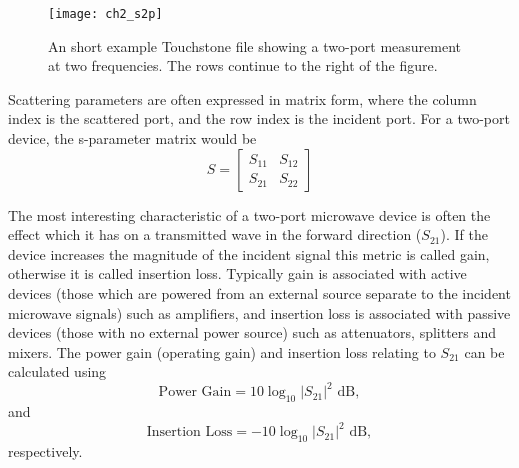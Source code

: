 \documentclass[../thesis.tex]{subfiles}
\begin{document}
\begin{refsection}
\begin{figure}
	\centering
	\texttt{[image: ch2\_s2p]}
	\caption{An short example Touchstone file showing a two-port measurement at two frequencies. The rows continue to the right of the figure.}
	\label{ch2_s2p}
\end{figure}

Scattering parameters are often expressed in matrix form, where the column index is the scattered port, and the row index is the incident port. For a two-port device, the s-parameter matrix would be
\begin{equation}
S=
\begin{bmatrix}
S_{11} & S_{12} \\
S_{21} & S_{22}
\end{bmatrix}
\end{equation}

The most interesting characteristic of a two-port microwave device is often the effect which it has on a transmitted wave in the forward direction ($S_{21}$). If the device increases the magnitude of the incident signal this metric is called gain, otherwise it is called insertion loss. Typically gain is associated with active devices (those which are powered from an external source separate to the incident microwave signals) such as amplifiers, and insertion loss is associated with passive devices (those with no external power source) such as attenuators, splitters and mixers. The power gain (operating gain) and insertion loss relating to $S_{21}$ can be calculated using
\begin{equation}
\textrm{Power Gain} = 10 \log_{10} |S_{21}|^2 \textrm{ dB},
\end{equation}
and
\begin{equation}
\textrm{Insertion Loss} = -10 \log_{10} |S_{21}|^2 \textrm{ dB},
\end{equation}
respectively.


\end{refsection}
\end{document}
